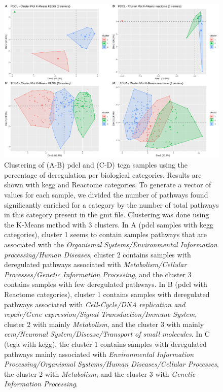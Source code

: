 \begin{figure}
    \begin{center}
        \includegraphics[width=\textwidth]{img/plot_cluster}
        \caption{
            Clustering of (A-B) \acrshort{pdcl} and (C-D) \acrshort{tcga} samples using the percentage of deregulation per biological categories.
            Results are shown with \acrshort{kegg} and Reactome categories.
            To generate a vector of values for each sample, we divided the number of pathways found significantly enriched for a category by the number of total pathways in this category present in the \acrshort{gmt} file.
            Clustering was done using the K-Means method with 3 clusters.
            In A (\acrshort{pdcl} samples with \acrshort{kegg} categories), cluster 1 seems to contain samples pathways that are associated with the \textit{Organismal Systems/Environmental Information processing/Human Diseases}, cluster 2 contains samples with deregulated pathways associated with \textit{Metabolism/Cellular Processes/Genetic Information Processing}, and the cluster 3 contains samples with few deregulated pathways.
            In B (\acrshort{pdcl} with Reactome categories), cluster 1 contains samples with deregulated pathways associated with \textit{Cell-Cycle/DNA replication and repair/Gene expression/Signal Transduction/Immune System}, cluster 2 with mainly \textit{Metabolism}, and the cluster 3 with mainly \textit{\acrshort{ecm}/Neuronal System/Disease/Transport of small molecules}.
            In C (\acrshort{tcga} with \acrshort{kegg}), the cluster 1 contains samples with deregulated pathways mainly associated with \textit{Environmental Information Processing/Organismal Systems/Human Diseases/Cellular Processes}, the cluster 2 with \textit{Metabolism}, and the cluster 3 with \textit{Genetic Information Processing}.
}
\end{center}
\end{figure}
